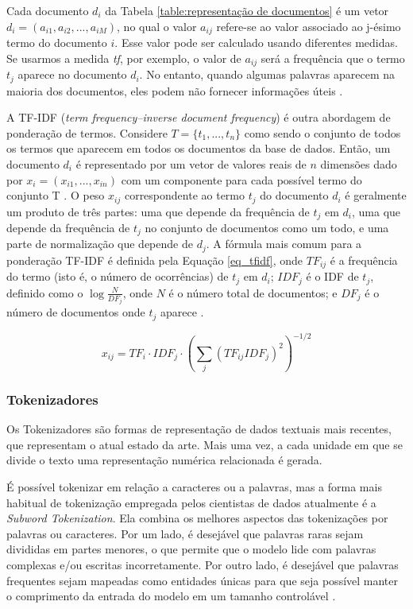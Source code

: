 Cada documento $d_i$ da Tabela \ref{table:representação de documentos} é um vetor $d_i = (a_{i1}, a_{i2}, ..., a_{iM})$, no qual o valor $a_{ij}$ refere-se ao valor associado ao j-ésimo termo do documento $i$. Esse valor pode ser calculado usando diferentes medidas. Se usarmos a medida \textit{tf}, por exemplo, o valor de $a_{ij}$ será a frequência que o termo $t_j$ aparece no documento $d_i$. No entanto, quando algumas palavras aparecem na maioria dos documentos, eles podem não fornecer informações úteis \cite{bag_of_words}.

A TF-IDF (\textit{term frequency–inverse document frequency}) é outra abordagem de ponderação de termos. Considere $T = \{t_1, ..., t_n\}$ como sendo o conjunto de todos os termos que aparecem em todos os documentos da base de dados. Então, um documento $d_i$ é representado por um vetor de valores reais de $n$ dimensões dado por $x_i = (x_{i1}, ..., x_{in})$ com um componente para cada possível termo do conjunto T \cite{tf-idf}. O peso $x_{ij}$ correspondente ao termo $t_j$ do documento $d_i$ é geralmente um produto de três partes: uma que depende da frequência de $t_j$ em $d_i$, uma que depende da frequência de $t_j$ no conjunto de documentos como um todo, e uma parte de normalização que depende de $d_j$. A fórmula mais comum para a ponderação TF-IDF é definida pela Equação \ref{eq_tfidf}, onde $TF_{ij}$ é a frequência do termo (isto é, o número de ocorrências) de $t_j$ em $d_i$; $IDF_{j}$ é o IDF de $t_j$, definido como o $\log{\frac{N}{DF_j}}$, onde $N$ é o número total de documentos; e $DF_j$ é o número de documentos onde $t_j$ aparece \cite{tf-idf}.

\begin{equation}\label{eq_tfidf}
        x_{ij} = TF_i \cdot IDF_j \cdot (\sum_j(TF_{ij}IDF_{j})^2)^{-1/2}
\end{equation}

\subsubsection{Tokenizadores}
\label{tokenizadores}
Os Tokenizadores são formas de representação de dados textuais mais recentes, que representam o atual estado da arte. Mais uma vez, a cada unidade em que se divide o texto uma representação numérica relacionada é gerada. 

É possível tokenizar em relação a caracteres ou a palavras, mas a forma mais habitual de tokenização empregada pelos cientistas de dados atualmente é a \textit{Subword Tokenization}. Ela combina os melhores aspectos das tokenizações por palavras ou caracteres. Por um lado, é desejável que palavras raras sejam divididas em partes menores, o que permite que o modelo lide com palavras complexas e/ou escritas incorretamente. Por outro lado, é desejável que palavras frequentes sejam mapeadas como entidades únicas para que seja possível manter o comprimento da entrada do modelo em um tamanho controlável \cite{transformers_book}. 

